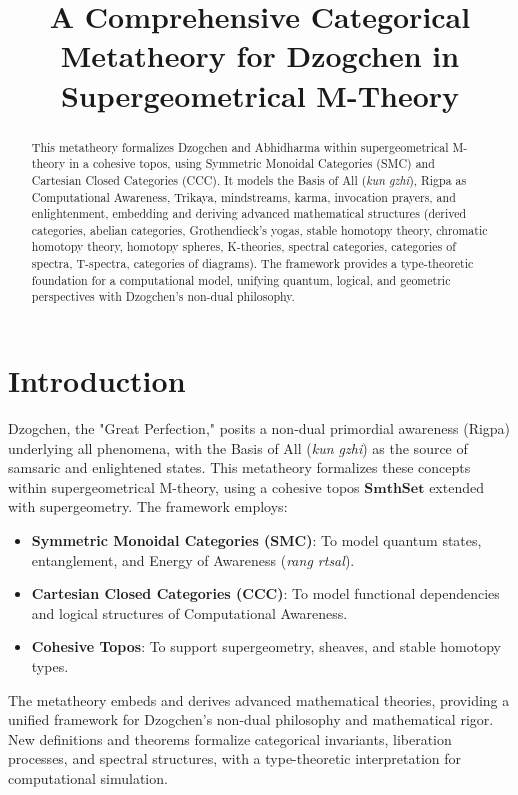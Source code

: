 \documentclass{article}
\begin{document}
\title{A Comprehensive Categorical Metatheory for Dzogchen in Supergeometrical M-Theory}
\author{}
\maketitle

\begin{abstract}
This metatheory formalizes Dzogchen and Abhidharma within supergeometrical M-theory in a cohesive topos, using Symmetric Monoidal Categories (SMC) and Cartesian Closed Categories (CCC). It models the Basis of All (\textit{kun gzhi}), Rigpa as Computational Awareness, Trikaya, mindstreams, karma, invocation prayers, and enlightenment, embedding and deriving advanced mathematical structures (derived categories, abelian categories, Grothendieck’s yogas, stable homotopy theory, chromatic homotopy theory, homotopy spheres, K-theories, spectral categories, categories of spectra, T-spectra, categories of diagrams). The framework provides a type-theoretic foundation for a computational model, unifying quantum, logical, and geometric perspectives with Dzogchen’s non-dual philosophy.
\end{abstract}

\tableofcontents

\section{Introduction}
Dzogchen, the "Great Perfection," posits a non-dual primordial awareness (Rigpa) underlying all phenomena, with the Basis of All (\textit{kun gzhi}) as the source of samsaric and enlightened states. This metatheory formalizes these concepts within supergeometrical M-theory, using a cohesive topos \(\mathbf{SmthSet}\) extended with supergeometry. The framework employs:
\begin{itemize}
    \item \textbf{Symmetric Monoidal Categories (SMC)}: To model quantum states, entanglement, and Energy of Awareness (\textit{rang rtsal}).
    \item \textbf{Cartesian Closed Categories (CCC)}: To model functional dependencies and logical structures of Computational Awareness.
    \item \textbf{Cohesive Topos}: To support supergeometry, sheaves, and stable homotopy types.
\end{itemize}
The metatheory embeds and derives advanced mathematical theories, providing a unified framework for Dzogchen’s non-dual philosophy and mathematical rigor. New definitions and theorems formalize categorical invariants, liberation processes, and spectral structures, with a type-theoretic interpretation for computational simulation.
\end{document}
